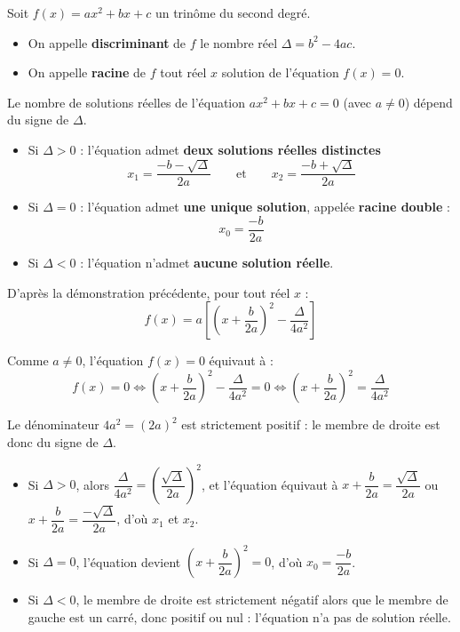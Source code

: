 \begin{df}
	Soit $f(x) = ax^2 + bx + c$ un trinôme du second degré.
	\begin{itemize}
		\item On appelle \textbf{discriminant} de $f$ le nombre réel $\Delta = b^2 - 4ac$.
		\item On appelle \textbf{racine} de $f$ tout réel $x$ solution de l'équation $f(x) = 0$.
	\end{itemize}
\end{df}

\begin{thm}
	Le nombre de solutions réelles de l'équation $ax^2 + bx + c = 0$ (avec $a \neq 0$) dépend du signe de $\Delta$.
	\begin{itemize}
		\item Si $\Delta > 0$ : l'équation admet \textbf{deux solutions réelles distinctes}
		      \[
			      x_1 = \frac{-b - \sqrt{\Delta}}{2a} \qquad \text{et} \qquad x_2 = \frac{-b + \sqrt{\Delta}}{2a}
		      \]
		\item Si $\Delta = 0$ : l'équation admet \textbf{une unique solution}, appelée \textbf{racine double} :
		      \[
			      x_0 = \frac{-b}{2a}
		      \]
		\item Si $\Delta < 0$ : l'équation n'admet \textbf{aucune solution réelle}.
	\end{itemize}
\end{thm}

\begin{demo}
	D'après la démonstration précédente, pour tout réel $x$ :
	\[
		f(x) = a \left[ \left(x + \frac{b}{2a}\right)^2 - \frac{\Delta}{4a^2} \right]
	\]

	Comme $a \neq 0$, l'équation $f(x) = 0$ équivaut à :
	\[
		f(x) = 0 \iff \left(x + \dfrac{b}{2a}\right)^2 - \dfrac{\Delta}{4a^2}=0 \iff \left(x + \dfrac{b}{2a}\right)^2 = \dfrac{\Delta}{4a^2}
	\]

	Le dénominateur $4a^2 = (2a)^2$ est strictement positif : le membre de droite est donc du signe de $\Delta$.
	\begin{itemize}
		\item Si $\Delta > 0$, alors $\dfrac{\Delta}{4a^2} = \left(\dfrac{\sqrt{\Delta}}{2a}\right)^2$, et l'équation équivaut à $x + \dfrac{b}{2a} = \dfrac{\sqrt{\Delta}}{2a}$ ou $x + \dfrac{b}{2a} = \dfrac{-\sqrt{\Delta}}{2a}$, d'où $x_1$ et $x_2$.
		\item Si $\Delta = 0$, l'équation devient $\left(x + \dfrac{b}{2a}\right)^2 = 0$, d'où $x_0 = \dfrac{-b}{2a}$.
		\item Si $\Delta < 0$, le membre de droite est strictement négatif alors que le membre de gauche est un carré, donc positif ou nul : l'équation n'a pas de solution réelle.
	\end{itemize}
\end{demo}

